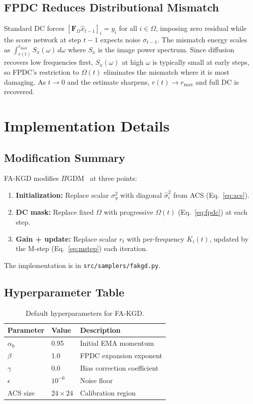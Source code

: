 \documentclass[10pt,twocolumn,letterpaper]{article}
\newcommand{\hatsig}{\hat{\sigma}}
\newcommand{\PIGDM}{$\Pi$GDM}
\begin{document}
\subsection{FPDC Reduces Distributional Mismatch}

Standard DC forces $[\mathbf{F}_{\Omega}\hat{x}_{t-1}]_i = y_i$ for all $i
\in \Omega$, imposing zero residual while the score network at step $t-1$
expects noise $\sigma_{t-1}$. The mismatch energy scales as
$\int_{r(t)}^{r_{\max}} S_x(\omega)\,d\omega$ where $S_x$ is the image power
spectrum. Since diffusion recovers low frequencies first, $S_x(\omega)$ at
high $\omega$ is typically small at early steps, so FPDC's restriction to
$\Omega(t)$ eliminates the mismatch where it is most damaging. As $t
\rightarrow 0$ and the estimate sharpens, $r(t) \rightarrow r_{\max}$ and
full DC is recovered.

\section{Implementation Details}
\label{app:impl}

\subsection{Modification Summary}

FA-KGD modifies \PIGDM{}~\cite{song2023pigdm} at three points:
\begin{enumerate}
  \item \textbf{Initialization:} Replace scalar $\sigma_y^2$ with diagonal
  $\hatsig_i^2$ from ACS (Eq.~\eqref{eq:acs}).
  \item \textbf{DC mask:} Replace fixed $\Omega$ with progressive $\Omega(t)$
  (Eq.~\eqref{eq:fpdc}) at each step.
  \item \textbf{Gain + update:} Replace scalar $r_t$ with per-frequency
  $K_i(t)$, updated by the M-step (Eq.~\eqref{eq:mstep}) each iteration.
\end{enumerate}
The implementation is in \texttt{src/samplers/fakgd.py}.

\subsection{Hyperparameter Table}

\begin{table}[h]
\centering
\caption{Default hyperparameters for FA-KGD.}
\label{tab:hparams}
\begin{tabular}{lll}
\toprule
\textbf{Parameter} & \textbf{Value} & \textbf{Description} \\
\midrule
$\alpha_0$ & 0.95 & Initial EMA momentum \\
$\beta$    & 1.0  & FPDC expansion exponent \\
$\gamma$   & 0.0  & Bias correction coefficient \\
$\epsilon$ & $10^{-6}$ & Noise floor \\
ACS size   & $24 \times 24$ & Calibration region \\
\bottomrule
\end{tabular}
\end{table}
\end{document}
